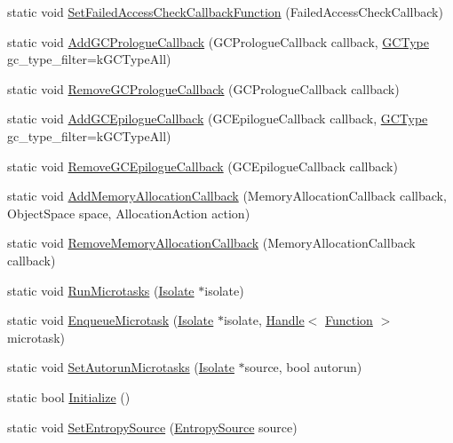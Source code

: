 \begin{DoxyCompactItemize}
\item 
static void \hyperlink{classv8_1_1_v8_aa6ed646d43360c209881871b3ac747aa}{Set\+Failed\+Access\+Check\+Callback\+Function} (Failed\+Access\+Check\+Callback)
\item 
static void \hyperlink{classv8_1_1_v8_a49c016f17c67f700387f801b2b29b5ab}{Add\+G\+C\+Prologue\+Callback} (G\+C\+Prologue\+Callback callback, \hyperlink{namespacev8_ac109d6f27e0c0f9ef4e98bcf7a806cf2}{G\+C\+Type} gc\+\_\+type\+\_\+filter=k\+G\+C\+Type\+All)
\item 
static void \hyperlink{classv8_1_1_v8_a7cdceb9c8ea5cd0887f69fd3bd97193f}{Remove\+G\+C\+Prologue\+Callback} (G\+C\+Prologue\+Callback callback)
\item 
static void \hyperlink{classv8_1_1_v8_a37aadf3536c772eb5bbf67fa7822679a}{Add\+G\+C\+Epilogue\+Callback} (G\+C\+Epilogue\+Callback callback, \hyperlink{namespacev8_ac109d6f27e0c0f9ef4e98bcf7a806cf2}{G\+C\+Type} gc\+\_\+type\+\_\+filter=k\+G\+C\+Type\+All)
\item 
static void \hyperlink{classv8_1_1_v8_a3382e4dae9865909242a8ee0b1d6bf77}{Remove\+G\+C\+Epilogue\+Callback} (G\+C\+Epilogue\+Callback callback)
\item 
static void \hyperlink{classv8_1_1_v8_ac9718f8dc3f3c498bf07282eb7c1618e}{Add\+Memory\+Allocation\+Callback} (Memory\+Allocation\+Callback callback, Object\+Space space, Allocation\+Action action)
\item 
static void \hyperlink{classv8_1_1_v8_a1e181f5bf42174b60cd5f4e3a0c20ce8}{Remove\+Memory\+Allocation\+Callback} (Memory\+Allocation\+Callback callback)
\item 
static void \hyperlink{classv8_1_1_v8_abca192a0a78615ad2b0ae3590e35c64b}{Run\+Microtasks} (\hyperlink{classv8_1_1_isolate}{Isolate} $\ast$isolate)
\item 
static void \hyperlink{classv8_1_1_v8_a84fc6b8fa0cb839be61301b6c5663c73}{Enqueue\+Microtask} (\hyperlink{classv8_1_1_isolate}{Isolate} $\ast$isolate, \hyperlink{classv8_1_1_handle}{Handle}$<$ \hyperlink{classv8_1_1_function}{Function} $>$ microtask)
\item 
static void \hyperlink{classv8_1_1_v8_a3fcc5fa4d4a10aab7faa2f0e9bfc7288}{Set\+Autorun\+Microtasks} (\hyperlink{classv8_1_1_isolate}{Isolate} $\ast$source, bool autorun)
\item 
static bool \hyperlink{classv8_1_1_v8_a40daec93ce44bdd922567fc121be9db8}{Initialize} ()
\item 
static void \hyperlink{classv8_1_1_v8_a5331ce9c858af264f30de667c74c5a76}{Set\+Entropy\+Source} (\hyperlink{namespacev8_ab699f4bbbb56350e6e915682e420fcdc}{Entropy\+Source} source)

\end{DoxyCompactItemize}
